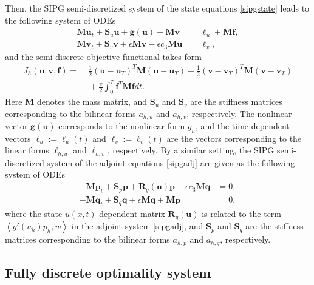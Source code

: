 \documentclass[preprint,12pt]{elsarticle}
\newcommand {\la}[1] {\left\langle {#1} \right\rangle }
\begin{document}
Then, the SIPG semi-discretized system of the state equations \eqref{sipgstate} leads to the following system of ODEs
\begin{equation}\label{full_order_ode_state}
\begin{aligned}
 \bm{M} \bm{u}_t +  {\bm S}_u\bm{u} +  \bm{g}(\bm{u}) + \bm{M}\bm{v}  &=  { \bm \ell}_u + \bm{M} \bm{f}, \\
 \bm{M} \bm{v}_t +  {\bm S}_v\bm{v} + \epsilon \bm{M} \bm{v} -\epsilon c_3 \bm{M} \bm{u} &=   \bm{\ell}_v,
\end{aligned}
\end{equation}
and the semi-discrete objective functional takes form
\begin{align*}
J_h(\bm{u},\bm{v},\bm{f}) = & \; \frac{1}{2}(\bm{u}-\bm{u}_T)^T\bm{M}(\bm{u}-\bm{u}_T) + \frac{1}{2}(\bm{v}-\bm{v}_T)^T\bm{M}(\bm{v}-\bm{v}_T) \\
& \; + \frac{\upsilon}{2}\int_0^T\bm{f}^T\bm{M}\bm{f}dt.
\end{align*}
Here $\bm{M}$ denotes the mass matrix, and  $\bm{S}_u$ and $\bm{S}_v$ are the stiffness matrices corresponding to the bilinear forms $a_{h,u}$ and $a_{h,v}$, respectively. The nonlinear vector $\bm{g}(\bm{u})$ corresponds to  the nonlinear form $g_h$, and the time-dependent vectors ${ \bm \ell}_u:={ \bm \ell}_u(t)$ and ${ \bm \ell}_v:={ \bm \ell}_v(t)$ are the vectors corresponding to the linear forms $\ell_{h,u}$ and $\ell_{h,v}$, respectively. By a similar setting, the SIPG semi-discretized system of the adjoint equations \eqref{sipgadj} are given as the following system of ODEs
\begin{equation}\label{full_order_ode_adj}
\begin{aligned}
 -\bm{M} \bm{p}_t +  {\bm S}_p\bm{p} + \bm{R}_g(\bm{u})\bm{p} -\epsilon c_3 \bm{M}\bm{q}  &=  0, \\
 -\bm{M} \bm{q}_t +  {\bm S}_q\bm{q} + \epsilon \bm{M} \bm{q} + \bm{M} \bm{p} &=  0,
\end{aligned}
\end{equation}
where the state $u(x,t)$ dependent matrix $\bm{R}_g(\bm{u})$ is related to the term $\la{g'(u_h)p_h,w}$ in the adjoint system \eqref{sipgadj}, and $\bm{S}_p$ and $\bm{S}_q$ are the stiffness matrices corresponding to the bilinear forms $a_{h,p}$ and $a_{h,q}$, respectively.


\subsection{Fully discrete optimality system}
\label{fullydisc_state}
\end{document}
